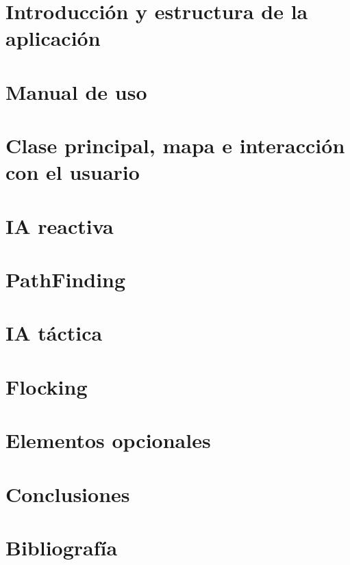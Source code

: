 \documentclass[a4paper,10pt]{article}
\begin{document}
\newpage
\part{Introducción y estructura de la aplicación}





\newpage
\part{Manual de uso}



\newpage
\part{Clase principal, mapa e interacción con el usuario}


\newpage





\newpage
\part{IA reactiva}









\newpage
\part{PathFinding}



\newpage
\part{IA táctica}

















\newpage
\part{Flocking}




\newpage
\part{Elementos opcionales}




\newpage
\part{Conclusiones}



\newpage
\part{Bibliografía}

\end{document}
